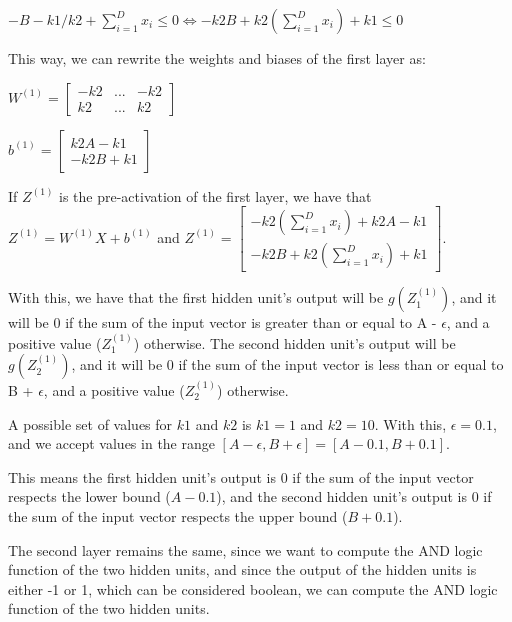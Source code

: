 \documentclass{article}
\begin{document}
\bigskip

$ -B - k1/k2 + \sum_{i=1}^{D} x_i \leq 0 \iff -k2B + k2(\sum_{i=1}^{D} x_i) + k1 \leq 0$

\bigskip

This way, we can rewrite the weights and biases of the first layer as:

\bigskip

\( W^{(1)} = \begin{bmatrix}
    -k2 & ...  & -k2\\
    k2 & ... & k2
\end{bmatrix}
\)

\bigskip

\(b^{(1)} = \begin{bmatrix}
    k2A - k1 \\
    -k2B + k1
\end{bmatrix}
\)

\bigskip

If $Z^{(1)}$ is the pre-activation of the first layer, we have that $Z^{(1)} = W^{(1)}X + b^{(1)}$ and
$Z^{(1)} = \begin{bmatrix}
    -k2(\sum_{i=1}^{D} x_i) + k2A - k1\\
    -k2B + k2(\sum_{i=1}^{D} x_i) + k1
\end{bmatrix}
$.

\bigskip

With this, we have that the first hidden unit's output will be $g(Z^{(1)}_1)$, and it will be 0 if the sum of the 
input vector is greater than or equal to A - $\epsilon$, and a positive value ($Z^{(1)}_1$) otherwise. 
The second hidden unit's output will be $g(Z^{(1)}_2)$, and it will be 0 if the sum of the input vector is less than or equal 
to B + $\epsilon$, and a positive value ($Z^{(1)}_2$) otherwise.

A possible set of values for $k1$ and $k2$ is $k1 = 1$ and $k2 = 10$. With this, $\epsilon = 0.1$, and we accept values in
the range $[A - \epsilon, B + \epsilon] = [A - 0.1, B + 0.1]$.

This means the first hidden unit's output is 0 if the sum of the input vector respects the lower bound ($A - 0.1$),
and the second hidden unit's output is 0 if the sum of the input vector respects the upper bound ($B + 0.1$).

\bigskip

The second layer remains the same, since we want to compute the AND logic function of the two hidden units, and since the output of
the hidden units is either -1 or 1, which can be considered boolean, we can compute the AND logic function of the two hidden units.
\end{document}
